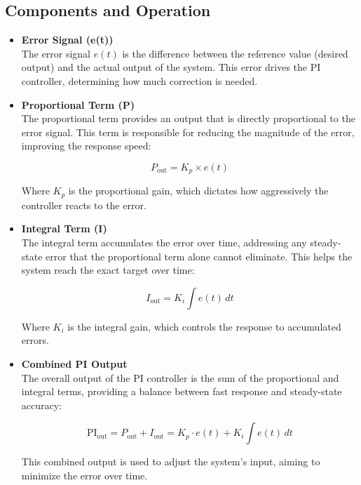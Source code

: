 \documentclass[12pt]{article}
\begin{document}
\subsection*{Components and Operation}

\begin{itemize}
    \item \textbf{Error Signal (e(t))} \\
    The error signal \( e(t) \) is the difference between the reference value (desired output) and the actual output of the system. This error drives the PI controller, determining how much correction is needed.

    \item \textbf{Proportional Term (P)} \\
    The proportional term provides an output that is directly proportional to the error signal. This term is responsible for reducing the magnitude of the error, improving the response speed:

    \[
    P_{\text{out}} = K_p \times e(t)
    \]

    Where \( K_p \) is the proportional gain, which dictates how aggressively the controller reacts to the error.

    \item \textbf{Integral Term (I)} \\
    The integral term accumulates the error over time, addressing any steady-state error that the proportional term alone cannot eliminate. This helps the system reach the exact target over time:

    \[
    I_{\text{out}} = K_i \int e(t) \, dt
    \]

    Where \( K_i \) is the integral gain, which controls the response to accumulated errors.

    \item \textbf{Combined PI Output} \\
    The overall output of the PI controller is the sum of the proportional and integral terms, providing a balance between fast response and steady-state accuracy:

    \[
    \text{PI}_{\text{out}} = P_{\text{out}} + I_{\text{out}} = K_p \cdot e(t) + K_i \int e(t) \, dt
    \]

    This combined output is used to adjust the system’s input, aiming to minimize the error over time.


\end{itemize}
\end{document}

